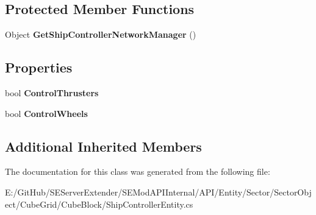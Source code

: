 \subsection*{Protected Member Functions}
\begin{DoxyCompactItemize}
\item 
\hypertarget{class_s_e_mod_a_p_i_internal_1_1_a_p_i_1_1_entity_1_1_sector_1_1_sector_object_1_1_cube_grid_1_1fd05c9636f75dd22094d44c0d12591d7_af67fafd3c0c5cd3b8b1a4cc8bc7c9c10}{}Object {\bfseries Get\+Ship\+Controller\+Network\+Manager} ()\label{class_s_e_mod_a_p_i_internal_1_1_a_p_i_1_1_entity_1_1_sector_1_1_sector_object_1_1_cube_grid_1_1fd05c9636f75dd22094d44c0d12591d7_af67fafd3c0c5cd3b8b1a4cc8bc7c9c10}

\end{DoxyCompactItemize}
\subsection*{Properties}
\begin{DoxyCompactItemize}
\item 
\hypertarget{class_s_e_mod_a_p_i_internal_1_1_a_p_i_1_1_entity_1_1_sector_1_1_sector_object_1_1_cube_grid_1_1fd05c9636f75dd22094d44c0d12591d7_a0726d3b6ff8bf31aace6674c2043be37}{}bool {\bfseries Control\+Thrusters}\label{class_s_e_mod_a_p_i_internal_1_1_a_p_i_1_1_entity_1_1_sector_1_1_sector_object_1_1_cube_grid_1_1fd05c9636f75dd22094d44c0d12591d7_a0726d3b6ff8bf31aace6674c2043be37}

\item 
\hypertarget{class_s_e_mod_a_p_i_internal_1_1_a_p_i_1_1_entity_1_1_sector_1_1_sector_object_1_1_cube_grid_1_1fd05c9636f75dd22094d44c0d12591d7_ad91462470173697ea40b2ac3bd247ecd}{}bool {\bfseries Control\+Wheels}\label{class_s_e_mod_a_p_i_internal_1_1_a_p_i_1_1_entity_1_1_sector_1_1_sector_object_1_1_cube_grid_1_1fd05c9636f75dd22094d44c0d12591d7_ad91462470173697ea40b2ac3bd247ecd}

\end{DoxyCompactItemize}
\subsection*{Additional Inherited Members}


The documentation for this class was generated from the following file\+:\begin{DoxyCompactItemize}
\item 
E\+:/\+Git\+Hub/\+S\+E\+Server\+Extender/\+S\+E\+Mod\+A\+P\+I\+Internal/\+A\+P\+I/\+Entity/\+Sector/\+Sector\+Object/\+Cube\+Grid/\+Cube\+Block/Ship\+Controller\+Entity.\+cs\end{DoxyCompactItemize}
